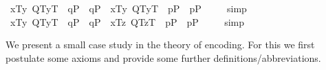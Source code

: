 \begin{isabellebody}
\ {\isachardoublequoteopen}{\isacharbrackleft}{\isasymlbrace}x\isactrlsup T{\isacharcomma}{\isacharparenleft}\isactrlbold {\isasymlambda}y{\isachardot}\ {\isacharparenleft}{\isasymlparr}Q\isactrlsup T{\isacharcomma}y\isactrlsup T{\isasymrparr}\ \isactrlbold {\isasymand}\ {\isacharparenleft}q\isactrlsup P\ \isactrlbold {\isasymor}\ \isactrlbold {\isasymnot}q\isactrlsup P{\isacharparenright}{\isacharparenright}{\isacharparenright}{\isasymrbrace}\ \isactrlbold {\isasymrightarrow}\ {\isasymlbrace}x\isactrlsup T{\isacharcomma}{\isacharparenleft}\isactrlbold {\isasymlambda}y{\isachardot}\ {\isacharparenleft}{\isasymlparr}Q\isactrlsup T{\isacharcomma}y\isactrlsup T{\isasymrparr}\ \isactrlbold {\isasymand}\ {\isacharparenleft}p\isactrlsup P\ \isactrlbold {\isasymor}\ \isactrlbold {\isasymnot}p\isactrlsup P{\isacharparenright}{\isacharparenright}{\isacharparenright}{\isasymrbrace}{\isacharbrackright}\ {\isacharequal}\ {\isasymtop}{\isachardoublequoteclose}%
\isadelimproof
\ %
\endisadelimproof
%
\isatagproof
{}\isamarkupfalse%
\ simp\ \isamarkupfalse%
%
\endisatagproof
{\isafoldproof}%
%
\isadelimproof
%
\endisadelimproof
\isanewline
\ \isamarkupfalse%
\ {\isachardoublequoteopen}{\isacharbrackleft}{\isasymlbrace}x\isactrlsup T{\isacharcomma}{\isacharparenleft}\isactrlbold {\isasymlambda}y{\isachardot}\ {\isacharparenleft}{\isasymlparr}Q\isactrlsup T{\isacharcomma}y\isactrlsup T{\isasymrparr}\ \isactrlbold {\isasymand}\ {\isacharparenleft}q\isactrlsup P\ \isactrlbold {\isasymor}\ \isactrlbold {\isasymnot}q\isactrlsup P{\isacharparenright}{\isacharparenright}{\isacharparenright}{\isasymrbrace}\ \isactrlbold {\isasymrightarrow}\ {\isasymlbrace}x\isactrlsup T{\isacharcomma}{\isacharparenleft}\isactrlbold {\isasymlambda}z{\isachardot}\ {\isacharparenleft}{\isasymlparr}Q\isactrlsup T{\isacharcomma}z\isactrlsup T{\isasymrparr}\ \isactrlbold {\isasymand}\ {\isacharparenleft}p\isactrlsup P\ \isactrlbold {\isasymor}\ \isactrlbold {\isasymnot}p\isactrlsup P{\isacharparenright}{\isacharparenright}{\isacharparenright}{\isasymrbrace}{\isacharbrackright}\ {\isacharequal}\ {\isasymtop}{\isachardoublequoteclose}%
\isadelimproof
\ %
\endisadelimproof
%
\isatagproof
{}\isamarkupfalse%
\ simp\ \isamarkupfalse%
%
\endisatagproof
{\isafoldproof}%
%
\isadelimproof
%
\endisadelimproof
%
\isamarkuptrue%
%
\begin{isamarkuptext}%
We present a small case study in the theory of encoding. For this we first
 postulate some axioms and provide some further definitions/abbreviations.%

\end{isamarkuptext}
\end{isabellebody}
